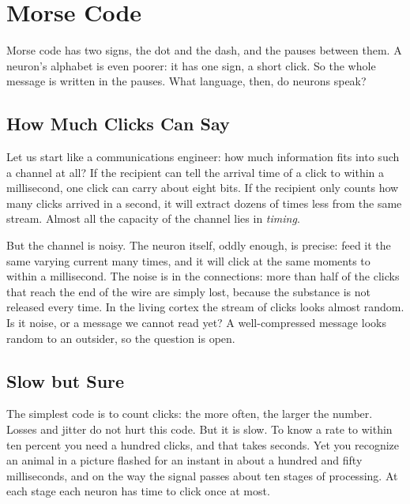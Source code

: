 \chapter{Morse Code}

Morse code has two signs, the dot and the dash, and the pauses between them. A neuron's alphabet is even poorer: it has one sign, a short click. So the whole message is written in the pauses. What language, then, do neurons speak?

\section*{How Much Clicks Can Say}

Let us start like a communications engineer: how much information fits into such a channel at all? If the recipient can tell the arrival time of a click to within a millisecond, one click can carry about eight bits. If the recipient only counts how many clicks arrived in a second, it will extract dozens of times less from the same stream. Almost all the capacity of the channel lies in \emph{timing}.


But the channel is noisy. The neuron itself, oddly enough, is precise: feed it the same varying current many times, and it will click at the same moments to within a millisecond. The noise is in the connections: more than half of the clicks that reach the end of the wire are simply lost, because the substance is not released every time. In the living cortex the stream of clicks looks almost random. Is it noise, or a message we cannot read yet? A well-compressed message looks random to an outsider, so the question is open.

\section*{Slow but Sure}

The simplest code is to count clicks: the more often, the larger the number. Losses and jitter do not hurt this code. But it is slow. To know a rate to within ten percent you need a hundred clicks, and that takes seconds. Yet you recognize an animal in a picture flashed for an instant in about a hundred and fifty milliseconds, and on the way the signal passes about ten stages of processing. At each stage each neuron has time to click once at most.

